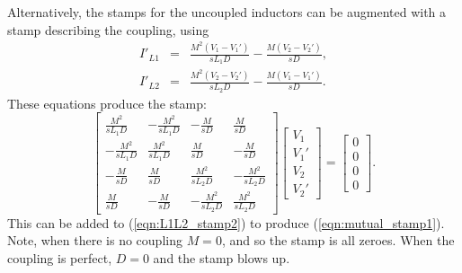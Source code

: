 \documentclass[a4paper, 12pt]{article}
\newcommand{\encp}[1]{\left(#1\right)}
\newcommand{\refeqn}[1]{\mbox{(\ref{eqn:#1})}}
\begin{document}
Alternatively, the stamps for the uncoupled inductors can be augmented
with a stamp describing the coupling, using
%
\begin{eqnarray}
  I'_{L1} & = & \frac{M^2\encp{V_1 - V_1'}}{sL_1 D} - \frac{M\encp{V_2 - V_2'}}{sD}, \\
  I'_{L2} & = & \frac{M^2\encp{V_2 - V_2'}}{sL_2 D} - \frac{M\encp{V_1 - V_1'}}{sD}.  
\end{eqnarray}
%
These equations produce the stamp:
%
\begin{equation}
  \begin{bmatrix}
    \frac{M^2}{sL_1 D} & -\frac{M^2}{sL_1 D} & -\frac{M}{sD}  & \frac{M}{sD} \\
   -\frac{M^2}{sL_1 D} & \frac{M^2}{sL_1 D}  & \frac{M}{sD}  & -\frac{M}{sD} \\
  -\frac{M}{sD} & \frac{M}{sD} &  \frac{M^2}{sL_2 D} & -\frac{M^2}{sL_2 D}   \\
   \frac{M}{sD} & -\frac{M}{sD} & -\frac{M^2}{sL_2 D} & \frac{M^2}{sL_2 D}  
  \end{bmatrix}
  \begin{bmatrix}
    V_1 \\ V_1' \\ V_2 \\ V_2'
  \end{bmatrix}
=
\begin{bmatrix}
0 \\ 0 \\ 0 \\ 0
\end{bmatrix}.
\end{equation}
%
This can be added to \refeqn{L1L2_stamp2} to produce
\refeqn{mutual_stamp1}.  Note, when there is no coupling $M=0$, and so
the stamp is all zeroes.  When the coupling is perfect, $D=0$ and the
stamp blows up.
\end{document}

